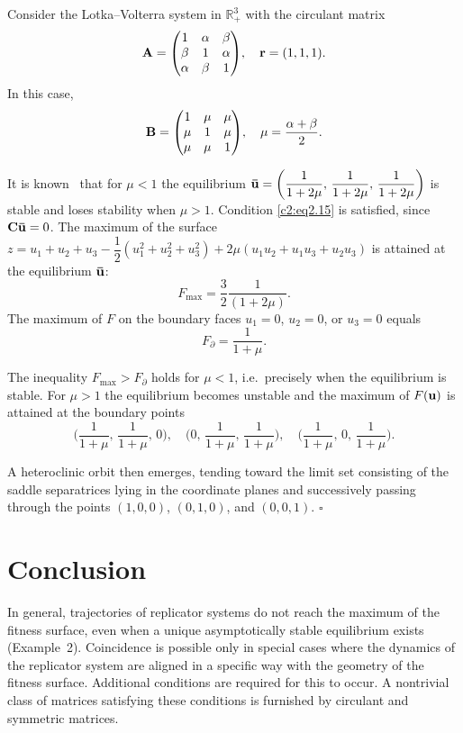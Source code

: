 \documentclass[12pt]{report}
\newcommand{\R}{\mathbb{R}}
\newcommand{\bound}{\partial}
\theoremstyle{definition}
\theoremstyle{remark}
\begin{document}
Consider the Lotka--Volterra system in $\R_{+}^{3}$ with the circulant matrix
$$
{\bf A} = 
\begin{pmatrix}
	1 & \alpha & \beta\\
	\beta & 1 & \alpha\\
	\alpha & \beta & 1\\
\end{pmatrix}\!,
\quad
{\bf r} = (1, 1, 1).
$$
In this case,
$$
{\bf B} = 
\begin{pmatrix}
	1 & \mu & \mu\\
	\mu & 1 & \mu\\
	\mu & \mu & 1\\
\end{pmatrix}\!,
\quad
\mu = \frac{\alpha + \beta}{2}.
$$

It is known~\cite{c2:Hofbauer2003} that for $\mu < 1$ the equilibrium ${\bf \bar{u}} = \left(\dfrac{1}{1 + 2\mu},\, \dfrac{1}{1 + 2\mu},\, \dfrac{1}{1 + 2\mu}\right)$ is stable and loses stability when $\mu > 1$. Condition \eqref{c2:eq2.15} is satisfied, since ${\bf C\bar{u}} = 0$.
The maximum of the surface $z = u_{1} + u_{2} + u_{3} - \dfrac{1}{2}(u_{1}^{2} + u_{2}^{2} + u_{3}^{2}) + 2\mu (u_{1}u_{2} + u_{1}u_{3} + u_{2}u_{3})$ is attained at the equilibrium ${\bf \bar{u}}$:
$$
F_{\max} = \frac{3}{2}\frac{1}{(1 + 2\mu)}.
$$ 
The maximum of $F$ on the boundary faces $u_{1} = 0$, $u_{2} = 0$, or $u_{3} = 0$ equals
$$
F_{\bound} = \frac{1}{1 + \mu}.
$$

The inequality $F_{\max} > F_{\bound}$ holds for $\mu < 1$, i.e.\ precisely when the equilibrium is stable. For $\mu > 1$ the equilibrium becomes unstable and the maximum of $F({\bf u})$ is attained at the boundary points
$$
\Big(\frac{1}{1 + \mu},\, \frac{1}{1 + \mu},\, 0\Big), \quad \Big(0,\, \frac{1}{1 + \mu},\, \frac{1}{1 + \mu}\Big),\quad \Big(\frac{1}{1 + \mu},\, 0,\, \frac{1}{1 + \mu}\Big).
$$

A heteroclinic orbit then emerges, tending toward the limit set consisting of the saddle separatrices lying in the coordinate planes and successively passing through the points $(1, 0, 0)$, $(0, 1, 0)$, and $(0, 0, 1)$.
\hfill$\square$

\clearpage

\section{Conclusion}\label{c2:section:2.6}
In general, trajectories of replicator systems do not reach the maximum of the fitness surface, even when a unique asymptotically stable equilibrium exists (Example~2). Coincidence is possible only in special cases where the dynamics of the replicator system are aligned in a specific way with the geometry of the fitness surface. Additional conditions are required for this to occur. A nontrivial class of matrices satisfying these conditions is furnished by circulant and symmetric matrices.
\end{document}

